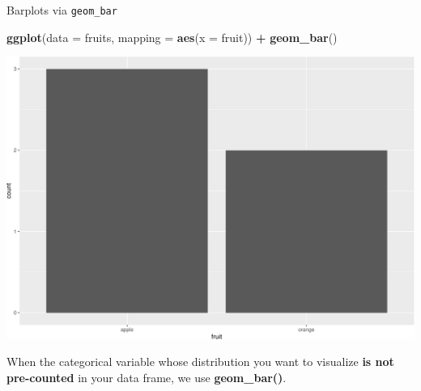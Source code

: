 \documentclass[
  ignorenonframetext,
]{beamer}
\newenvironment{Shaded}{\begin{snugshade}}{\end{snugshade}}
\newcommand{\AttributeTok}[1]{\textcolor[rgb]{0.13,0.29,0.53}{#1}}
\newcommand{\FunctionTok}[1]{\textcolor[rgb]{0.13,0.29,0.53}{\textbf{#1}}}
\newcommand{\NormalTok}[1]{#1}
\newcommand{\SpecialCharTok}[1]{\textcolor[rgb]{0.81,0.36,0.00}{\textbf{#1}}}
\begin{document}
\begin{frame}[fragile]{Barplots via \texttt{geom\_bar}}
\protect\hypertarget{barplots-via-geom_bar}{}
\tiny

\begin{Shaded}
\begin{Highlighting}[]
\FunctionTok{ggplot}\NormalTok{(}\AttributeTok{data =}\NormalTok{ fruits, }\AttributeTok{mapping =} \FunctionTok{aes}\NormalTok{(}\AttributeTok{x =}\NormalTok{ fruit)) }\SpecialCharTok{+}
  \FunctionTok{geom\_bar}\NormalTok{()}
\end{Highlighting}
\end{Shaded}

\begin{center}\includegraphics[width=0.9\linewidth,height=0.5\textheight]{Week2_files/figure-beamer/unnamed-chunk-38-1} \end{center}
\normalsize

When the categorical variable whose distribution you want to visualize
\textbf{is not pre-counted} in your data frame, we use
\textbf{geom\_bar()}.
\end{frame}
\end{document}
